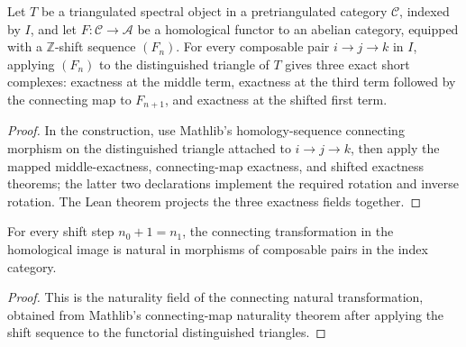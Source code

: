 \begin{theorem}
  \label{thm:homological-spectral-object-exactness}
  \leanok
  Let $T$ be a triangulated spectral object in a pretriangulated category
  $\mathcal C$, indexed by $I$, and let $F:\mathcal C\to\mathcal A$ be a
  homological functor to an abelian category, equipped with a $\mathbb Z$-shift
  sequence $(F_n)$.  For every composable pair $i\to j\to k$ in $I$, applying
  $(F_n)$ to the distinguished triangle of $T$ gives three exact short
  complexes: exactness at the middle term, exactness at the third term followed
  by the connecting map to $F_{n+1}$, and exactness at the shifted first term.
\end{theorem}

\begin{proof}
  \leanok
  In the construction, use Mathlib's homology-sequence connecting morphism on
  the distinguished triangle attached to $i\to j\to k$, then apply the mapped
  middle-exactness, connecting-map exactness, and shifted exactness theorems;
  the latter two declarations implement the required rotation and inverse
  rotation.  The Lean theorem projects the three exactness fields together.
\end{proof}

\begin{theorem}
  \label{thm:homological-image-delta-naturality}
  \leanok
  For every shift step $n_0+1=n_1$, the connecting transformation in the
  homological image is natural in morphisms of composable pairs in the index
  category.
\end{theorem}

\begin{proof}
  \leanok
  This is the naturality field of the connecting natural transformation,
  obtained from Mathlib's connecting-map naturality theorem after applying the
  shift sequence to the functorial distinguished triangles.
\end{proof}

